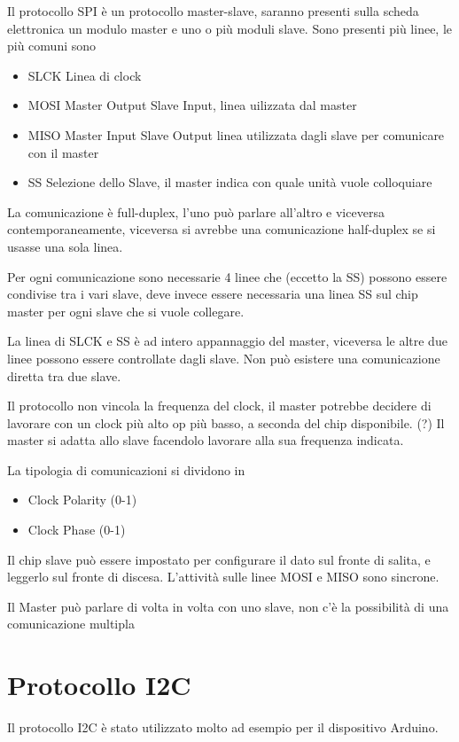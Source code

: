 Il protocollo SPI è un protocollo master-slave, saranno presenti sulla scheda
elettronica un modulo master e uno o più moduli slave.
Sono presenti più linee, le più comuni sono
\begin{itemize}
\item SLCK Linea di clock
\item MOSI Master Output Slave Input, linea uilizzata dal master
\item MISO Master Input Slave Output linea utilizzata dagli slave per
comunicare con il master
\item SS Selezione dello Slave, il master indica con quale unità vuole
colloquiare
\end{itemize}
La comunicazione è full-duplex, l'uno può parlare all'altro e viceversa
contemporaneamente, viceversa si avrebbe una comunicazione half-duplex se si
usasse una sola linea.

Per ogni comunicazione sono necessarie 4 linee che (eccetto la SS) possono
essere condivise tra i vari slave, deve invece essere necessaria una linea SS
sul chip master per ogni slave che si vuole collegare.

La linea di SLCK e SS è ad intero appannaggio del master, viceversa le altre
due linee possono essere controllate dagli slave.
Non può esistere una comunicazione diretta tra due slave.

Il protocollo non vincola la frequenza del clock, il master potrebbe decidere di
lavorare con un clock più alto op più basso, a seconda del chip disponibile.
(?) Il master si adatta allo slave facendolo lavorare alla sua frequenza
indicata.

La tipologia di comunicazioni si dividono in
\begin{itemize}
 \item Clock Polarity (0-1)
\item Clock Phase (0-1)
\end{itemize}

Il chip slave può essere impostato per configurare il dato sul fronte di
salita, e leggerlo sul fronte di discesa.
L'attività sulle linee MOSI e MISO sono sincrone.


Il Master può parlare di volta in volta con uno slave, non c'è la
possibilità di una comunicazione multipla


\section{Protocollo I2C}
Il protocollo I2C è stato utilizzato molto ad esempio per il dispositivo
Arduino.

